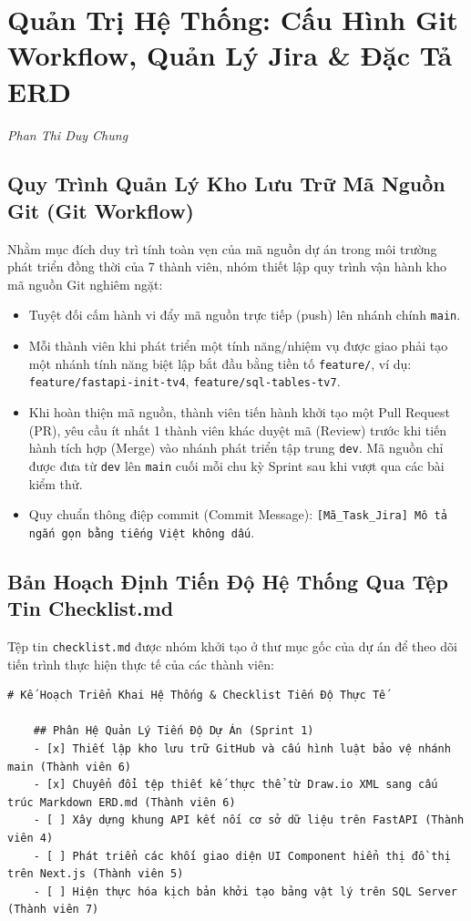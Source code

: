 \chapter{Quản Trị Hệ Thống: Cấu Hình Git Workflow, Quản Lý Jira \& Đặc Tả ERD}
\label{ch:system_administration}
\textit{Phan Thi Duy Chung}

\section{Quy Trình Quản Lý Kho Lưu Trữ Mã Nguồn Git (Git Workflow)}
Nhằm mục đích duy trì tính toàn vẹn của mã nguồn dự án trong môi trường phát triển đồng thời của 7 thành viên, nhóm thiết lập quy trình vận hành kho mã nguồn Git nghiêm ngặt:
\begin{itemize}
	\item Tuyệt đối cấm hành vi đẩy mã nguồn trực tiếp (push) lên nhánh chính \texttt{main}.
	\item Mỗi thành viên khi phát triển một tính năng/nhiệm vụ được giao phải tạo một nhánh tính năng biệt lập bắt đầu bằng tiền tố \texttt{feature/}, ví dụ: \texttt{feature/fastapi-init-tv4}, \texttt{feature/sql-tables-tv7}.
	\hline
	\item Khi hoàn thiện mã nguồn, thành viên tiến hành khởi tạo một Pull Request (PR), yêu cầu ít nhất 1 thành viên khác duyệt mã (Review) trước khi tiến hành tích hợp (Merge) vào nhánh phát triển tập trung \texttt{dev}. Mã nguồn chỉ được đưa từ \texttt{dev} lên \texttt{main} cuối mỗi chu kỳ Sprint sau khi vượt qua các bài kiểm thử.
	\item Quy chuẩn thông điệp commit (Commit Message): \texttt{[Mã\_Task\_Jira] Mô tả ngắn gọn bằng tiếng Việt không dấu}.
\end{itemize}

\section{Bản Hoạch Định Tiến Độ Hệ Thống Qua Tệp Tin Checklist.md}
Tệp tin \texttt{checklist.md} được nhóm khởi tạo ở thư mục gốc của dự án để theo dõi tiến trình thực hiện thực tế của các thành viên:
\begin{lstlisting}[caption=Nội dung cấu trúc tệp tin quản lý tiến độ checklist.md]
	# Kế Hoạch Triển Khai Hệ Thống & Checklist Tiến Độ Thực Tế
	
	## Phân Hệ Quản Lý Tiến Độ Dự Án (Sprint 1)
	- [x] Thiết lập kho lưu trữ GitHub và cấu hình luật bảo vệ nhánh main (Thành viên 6)
	- [x] Chuyển đổi tệp thiết kế thực thể từ Draw.io XML sang cấu trúc Markdown ERD.md (Thành viên 6)
	- [ ] Xây dựng khung API kết nối cơ sở dữ liệu trên FastAPI (Thành viên 4)
	- [ ] Phát triển các khối giao diện UI Component hiển thị đồ thị trên Next.js (Thành viên 5)
	- [ ] Hiện thực hóa kịch bản khởi tạo bảng vật lý trên SQL Server (Thành viên 7)
\end{lstlisting}

